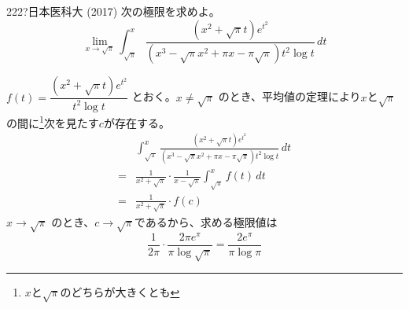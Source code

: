 \begin{prob}{222}{\hosi ?}{日本医科大 (2017)}
 次の極限を求めよ。 \\
 \[ \lim_{x\to\sqrt{\pi}} \int_{\sqrt{\pi}}^x\! \frac{(x^2+\sqrt{\pi}t)e^{t^2}}{(x^3-\sqrt{\pi}x^2+\pi x-\pi\sqrt{\pi})t^2\log t} \,dt \]
\end{prob}

$f(t)=\dfrac{(x^2+\sqrt{\pi} t)e^{t^2}}{t^2\log t}$ とおく。$x\neq\sqrt{\pi}$ のとき、平均値の定理により$x$と$\sqrt{\pi}$の間に\footnote{$x$と$\sqrt{\pi}$のどちらが大きくとも}次を見たす$c$が存在する。
\begin{align*}
 &\int_{\sqrt{\pi}}^x\! \frac{(x^2+\sqrt{\pi}t)e^{t^2}}{(x^3-\sqrt{\pi}x^2+\pi x-\pi\sqrt{\pi})t^2\log t} \,dt \\
 =& \frac{1}{x^2+\sqrt{\pi}}\cdot\frac{1}{x-\sqrt{\pi}}\int_{\sqrt{\pi}}^x\!f(t)\,dt \\
 =& \frac{1}{x^2+\sqrt{\pi}}\cdot f(c)
\end{align*}
$x\to\sqrt{\pi}$ のとき、$c\to\sqrt{\pi}$であるから、求める極限値は
\[ \frac{1}{2\pi}\cdot\frac{2\pi e^\pi}{\pi\log\sqrt{\pi}} = \frac{2e^\pi}{\pi\log\pi} \]